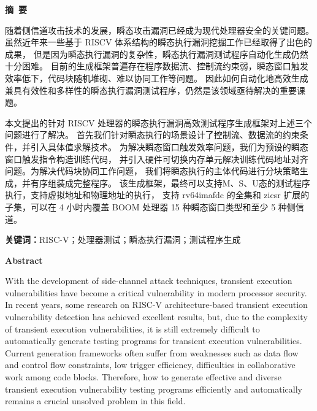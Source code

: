 \cleardoublepage{}
\begin{center}
    \bfseries {} 摘~要
\end{center}

随着侧信道攻击技术的发展，瞬态攻击漏洞已经成为现代处理器安全的关键问题。
虽然近年来一些基于 RISCV 体系结构的瞬态执行漏洞挖掘工作已经取得了出色的成果，
但是因为瞬态执行漏洞的复杂性，瞬态执行漏洞测试程序自动化生成仍然十分困难。
目前的生成框架普遍存在程序数据流、控制流约束弱，瞬态窗口触发效率低下，代码块随机堆砌、难以协同工作等问题。
因此如何自动化地高效生成兼具有效性和多样性的瞬态执行漏洞测试程序，仍然是该领域亟待解决的重要课题。\par

本文提出的针对 RISCV 处理器的瞬态执行漏洞高效测试程序生成框架对上述三个问题进行了解决。
首先我们针对瞬态执行的场景设计了控制流、数据流的约束条件，并引入具体值求解技术。
为解决瞬态窗口触发效率问题，我们为预设的瞬态窗口触发指令构造训练代码，
并引入硬件可切换内存单元解决训练代码地址对齐问题。为解决代码块协同工作问题，
我们将瞬态执行的主体代码进行分块策略生成，并有序组装成完整程序。
该生成框架，最终可以支持M、S、U态的测试程序执行，支持虚拟地址和物理地址的执行，
支持 rv64imafdc 的全集和 zicsr 扩展的子集，可以在 4 小时内覆盖 BOOM 处理器
 15 种瞬态窗口类型和至少 5 种侧信道。\par

\textbf{关键词：}RISC-V；处理器测试；瞬态执行漏洞；测试程序生成

\cleardoublepage{}
\begin{center}
    \bfseries {} Abstract
\end{center}

With the development of side-channel attack techniques, 
transient execution vulnerabilities have become a critical vulnerability
in modern processor security. In recent years, 
some research on RISC-V architecture-based transient execution vulnerability detection 
has achieved excellent results,
but, due to the complexity of transient execution vulnerabilities, 
it is still extremely difficult to automatically generate testing programs for transient execution vulnerabilities.
Current generation frameworks often suffer from weaknesses 
such as data flow and control flow constraints, 
low trigger efficiency, difficulties in collaborative work among code blocks. 
Therefore, how to generate effective and diverse transient execution vulnerability testing programs 
efficiently and automatically remains a crucial unsolved problem in this field.\par

